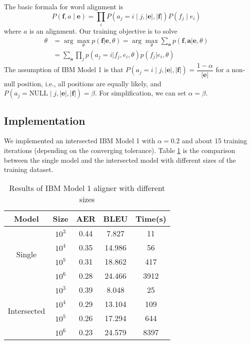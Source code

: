 \documentclass[11pt,a4paper]{article}
\begin{document}
The basic formala for word alignment is 
\[
  P(\mathbf{f},a\mid \mathbf{e}) = \prod\limits_i P(a_j = i\mid j, |\mathbf{e}|, |\mathbf{f}|) P(f_j\mid e_i)
\] where $a$ is an alignment. Our training objective is to solve
\begin{align*}
  \theta &= \arg\max\limits_\theta p(\mathbf{f} | \mathbf{e}, \theta) = \arg\max\limits_\theta \sum\limits_\mathbf{a} p(\mathbf{f}, \mathbf{a}| \mathbf{e}, \theta) \\
  &= \sum\limits_\mathbf{a}\prod\limits_j p(a_j = i|f_j,e_i,\theta)p(f_j|e_i,\theta)
\end{align*}
The assumption of IBM Model 1 is that $P(a_j = i\mid j, |\mathbf{e}|, |\mathbf{f}|) = \dfrac{1-\alpha}{|\mathbf{e}|}$ for a non-null position, i.e., all positions are equally likely, and $
  P(a_j = \text{NULL}\mid j, |\mathbf{e}|, |\mathbf{f}|) = \beta$. For simplification, we can set $\alpha = \beta$.

\subsection{Implementation}
We implemented an intersected IBM Model 1 with $\alpha = 0.2$ and about 15 training iterations (depending on the converging tolerance). Table \ref{tab:ibm-size} is the comparison between the single model and the intersected model with different sizes of the training dataset.
\begin{table}[h!]
  \begin{center}
  \begin{tabular}{|c|c|c|c|c|}
  \hline 
  \bf Model & \bf Size &\bf AER & \bf BLEU & \bf Time(s) \\ 
  \hline
  \multirow{4}{*}{Single} & $10^3$ & 0.44 & 7.827 & 11 \\
  \hhline{~----} & $10^4$ & 0.35 & 14.986 & 56 \\
  
  \hhline{~----} & $10^5$ & 0.31 & 18.862 & 417 \\
  
  \hhline{~----} & $10^6$ & 0.28 & 24.466 & 3912 \\
  \hline
  \multirow{4}{*}{Intersected} & $10^3$ & 0.39 & 8.048 & 25 \\
  \hhline{~----} & $10^4$ & 0.29 & 13.104 & 109 \\
  
  \hhline{~----} & $10^5$ & 0.26 & 17.294 & 644 \\
  
  \hhline{~----} & $10^6$ & 0.23 & 24.579 & 8397 \\
  \hline
  \end{tabular}
  \end{center}
  \caption{Results of IBM Model 1 aligner with different sizes}
  \label{tab:ibm-size}
\end{table}
\end{document}
